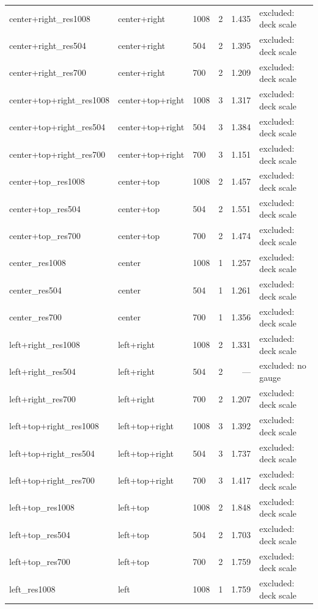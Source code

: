 \begin{longtable}{@{}lllrrl@{}}
  center+right\_res1008 & center+right & 1008 & 2 & 1.435 & excluded: deck scale \\
  center+right\_res504 & center+right & 504 & 2 & 1.395 & excluded: deck scale \\
  center+right\_res700 & center+right & 700 & 2 & 1.209 & excluded: deck scale \\
  center+top+right\_res1008 & center+top+right & 1008 & 3 & 1.317 & excluded: deck scale \\
  center+top+right\_res504 & center+top+right & 504 & 3 & 1.384 & excluded: deck scale \\
  center+top+right\_res700 & center+top+right & 700 & 3 & 1.151 & excluded: deck scale \\
  center+top\_res1008 & center+top & 1008 & 2 & 1.457 & excluded: deck scale \\
  center+top\_res504 & center+top & 504 & 2 & 1.551 & excluded: deck scale \\
  center+top\_res700 & center+top & 700 & 2 & 1.474 & excluded: deck scale \\
  center\_res1008 & center & 1008 & 1 & 1.257 & excluded: deck scale \\
  center\_res504 & center & 504 & 1 & 1.261 & excluded: deck scale \\
  center\_res700 & center & 700 & 1 & 1.356 & excluded: deck scale \\
  left+right\_res1008 & left+right & 1008 & 2 & 1.331 & excluded: deck scale \\
  left+right\_res504 & left+right & 504 & 2 & --- & excluded: no gauge \\
  left+right\_res700 & left+right & 700 & 2 & 1.207 & excluded: deck scale \\
  left+top+right\_res1008 & left+top+right & 1008 & 3 & 1.392 & excluded: deck scale \\
  left+top+right\_res504 & left+top+right & 504 & 3 & 1.737 & excluded: deck scale \\
  left+top+right\_res700 & left+top+right & 700 & 3 & 1.417 & excluded: deck scale \\
  left+top\_res1008 & left+top & 1008 & 2 & 1.848 & excluded: deck scale \\
  left+top\_res504 & left+top & 504 & 2 & 1.703 & excluded: deck scale \\
  left+top\_res700 & left+top & 700 & 2 & 1.759 & excluded: deck scale \\
  left\_res1008 & left & 1008 & 1 & 1.759 & excluded: deck scale \\

\end{longtable}
